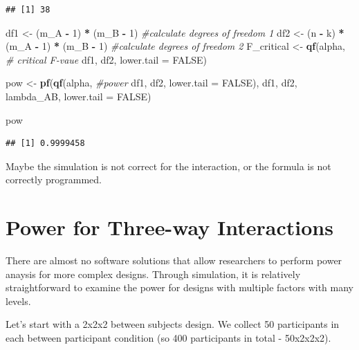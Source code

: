 \documentclass[]{book}
\newenvironment{Shaded}{\begin{snugshade}}{\end{snugshade}}
\newcommand{\CommentTok}[1]{\textcolor[rgb]{0.56,0.35,0.01}{\textit{#1}}}
\newcommand{\DataTypeTok}[1]{\textcolor[rgb]{0.13,0.29,0.53}{#1}}
\newcommand{\DecValTok}[1]{\textcolor[rgb]{0.00,0.00,0.81}{#1}}
\newcommand{\KeywordTok}[1]{\textcolor[rgb]{0.13,0.29,0.53}{\textbf{#1}}}
\newcommand{\NormalTok}[1]{#1}
\newcommand{\OperatorTok}[1]{\textcolor[rgb]{0.81,0.36,0.00}{\textbf{#1}}}
\newcommand{\OtherTok}[1]{\textcolor[rgb]{0.56,0.35,0.01}{#1}}
\newcommand{\StringTok}[1]{\textcolor[rgb]{0.31,0.60,0.02}{#1}}
\begin{document}
\begin{verbatim}
## [1] 38
\end{verbatim}

\begin{Shaded}
\begin{Highlighting}[]
\NormalTok{df1 <-}\StringTok{ }\NormalTok{(m_A }\OperatorTok{-}\StringTok{ }\DecValTok{1}\NormalTok{) }\OperatorTok{*}\StringTok{ }\NormalTok{(m_B }\OperatorTok{-}\StringTok{ }\DecValTok{1}\NormalTok{)  }\CommentTok{#calculate degrees of freedom 1}
\NormalTok{df2 <-}
\NormalTok{(n }\OperatorTok{-}\StringTok{ }\NormalTok{k) }\OperatorTok{*}\StringTok{ }\NormalTok{(m_A }\OperatorTok{-}\StringTok{ }\DecValTok{1}\NormalTok{) }\OperatorTok{*}\StringTok{ }\NormalTok{(m_B }\OperatorTok{-}\StringTok{ }\DecValTok{1}\NormalTok{) }\CommentTok{#calculate degrees of freedom 2}
\NormalTok{F_critical <-}\StringTok{ }\KeywordTok{qf}\NormalTok{(alpha, }\CommentTok{# critical F-vaue}
\NormalTok{df1,}
\NormalTok{df2,}
\DataTypeTok{lower.tail =} \OtherTok{FALSE}\NormalTok{)}

\NormalTok{pow <-}\StringTok{ }\KeywordTok{pf}\NormalTok{(}\KeywordTok{qf}\NormalTok{(alpha, }\CommentTok{#power}
\NormalTok{df1,}
\NormalTok{df2,}
\DataTypeTok{lower.tail =} \OtherTok{FALSE}\NormalTok{),}
\NormalTok{df1,}
\NormalTok{df2,}
\NormalTok{lambda_AB,}
\DataTypeTok{lower.tail =} \OtherTok{FALSE}\NormalTok{)}

\NormalTok{pow}
\end{Highlighting}
\end{Shaded}

\begin{verbatim}
## [1] 0.9999458
\end{verbatim}

Maybe the simulation is not correct for the interaction, or the formula is not correctly programmed.

\hypertarget{power-for-three-way-interactions}{%
\chapter{Power for Three-way Interactions}\label{power-for-three-way-interactions}}

There are almost no software solutions that allow researchers to perform power anaysis for more complex designs. Through simulation, it is relatively straightforward to examine the power for designs with multiple factors with many levels.

Let's start with a 2x2x2 between subjects design. We collect 50 participants in each between participant condition (so 400 participants in total - 50x2x2x2).
\end{document}

